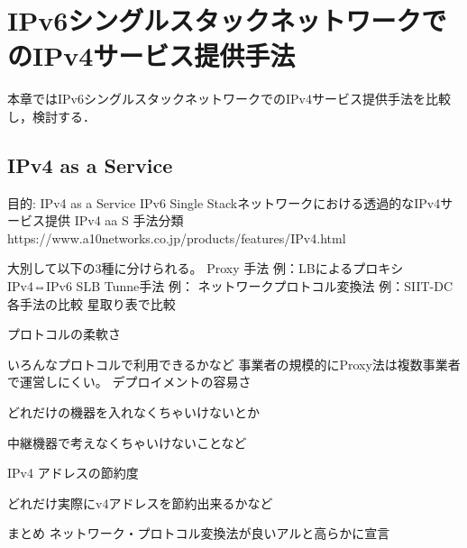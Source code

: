 \chapter{IPv6シングルスタックネットワークでのIPv4サービス提供手法}
\label{related}
本章ではIPv6シングルスタックネットワークでのIPv4サービス提供手法を比較し，検討する．

\section{IPv4 as a Service}

目的: IPv4 as a Service
 IPv6 Single Stackネットワークにおける透過的なIPv4サービス提供
IPv4 aa S 手法分類
https://www.a10networks.co.jp/products/features/IPv4.html

 大別して以下の3種に分けられる。
Proxy 手法
例：LBによるプロキシ
IPv4⇔IPv6 SLB
Tunne手法
例：
ネットワークプロトコル変換法
例：SIIT-DC
各手法の比較
星取り表で比較

 プロトコルの柔軟さ

いろんなプロトコルで利用できるかなど
事業者の規模的にProxy法は複数事業者で運営しにくい。
 デプロイメントの容易さ

どれだけの機器を入れなくちゃいけないとか

中継機器で考えなくちゃいけないことなど

 IPv4 アドレスの節約度

どれだけ実際にv4アドレスを節約出来るかなど

まとめ
 ネットワーク・プロトコル変換法が良いアルと高らかに宣言
